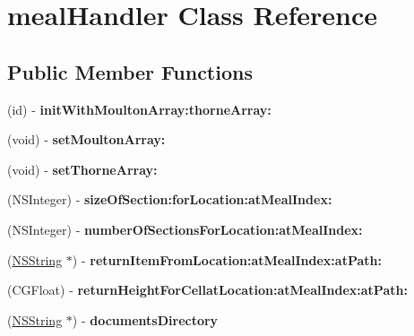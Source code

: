 \hypertarget{interfacemeal_handler}{
\section{mealHandler Class Reference}
\label{interfacemeal_handler}
}
\subsection*{Public Member Functions}
\begin{DoxyCompactItemize}
\item 
\hypertarget{interfacemeal_handler_ad1b6e5b20913153df59f88b2da56f210}{
(id) -\/ {\bfseries initWithMoultonArray:thorneArray:}}
\label{interfacemeal_handler_ad1b6e5b20913153df59f88b2da56f210}

\item 
\hypertarget{interfacemeal_handler_a1df84ba537f067b92bb93bdddd259740}{
(void) -\/ {\bfseries setMoultonArray:}}
\label{interfacemeal_handler_a1df84ba537f067b92bb93bdddd259740}

\item 
\hypertarget{interfacemeal_handler_ac093e8aa318718588dcf86366293b458}{
(void) -\/ {\bfseries setThorneArray:}}
\label{interfacemeal_handler_ac093e8aa318718588dcf86366293b458}

\item 
\hypertarget{interfacemeal_handler_af532f24f045a235369ba90960cd23d65}{
(NSInteger) -\/ {\bfseries sizeOfSection:forLocation:atMealIndex:}}
\label{interfacemeal_handler_af532f24f045a235369ba90960cd23d65}

\item 
\hypertarget{interfacemeal_handler_a747a98d00b202f8f9d26c94549d3a2d5}{
(NSInteger) -\/ {\bfseries numberOfSectionsForLocation:atMealIndex:}}
\label{interfacemeal_handler_a747a98d00b202f8f9d26c94549d3a2d5}

\item 
\hypertarget{interfacemeal_handler_a75f6099943727261359578cf12150972}{
(\hyperlink{class_n_s_string}{NSString} $\ast$) -\/ {\bfseries returnItemFromLocation:atMealIndex:atPath:}}
\label{interfacemeal_handler_a75f6099943727261359578cf12150972}

\item 
\hypertarget{interfacemeal_handler_aa7aee9b82e908b174bed46cd08cb069a}{
(CGFloat) -\/ {\bfseries returnHeightForCellatLocation:atMealIndex:atPath:}}
\label{interfacemeal_handler_aa7aee9b82e908b174bed46cd08cb069a}

\item 
\hypertarget{interfacemeal_handler_ac2d5ffea63f674216414cdb05c5eb035}{
(\hyperlink{class_n_s_string}{NSString} $\ast$) -\/ {\bfseries documentsDirectory}}
\label{interfacemeal_handler_ac2d5ffea63f674216414cdb05c5eb035}

\end{DoxyCompactItemize}
